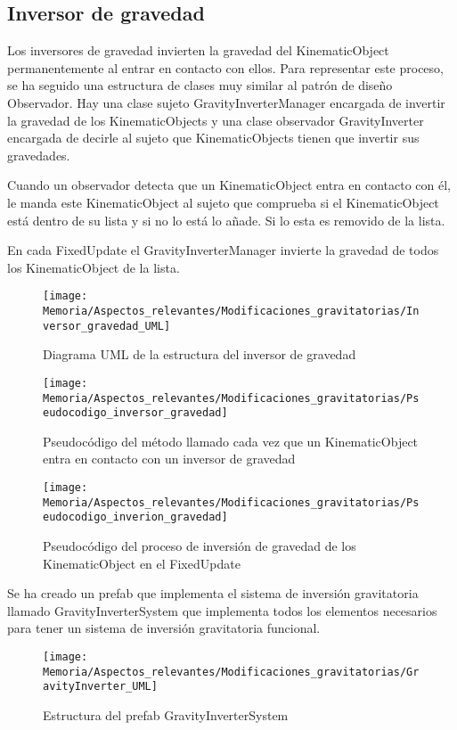 \subsection{Inversor de gravedad}
Los inversores de gravedad invierten la gravedad del KinematicObject permanentemente al entrar en contacto con ellos. Para representar este proceso, se ha seguido una estructura de clases muy similar al patrón de diseño Observador. Hay una clase sujeto GravityInverterManager encargada de invertir la gravedad de los KinematicObjects y una clase observador GravityInverter encargada de decirle al sujeto que KinematicObjects tienen que invertir sus gravedades.

Cuando un observador detecta que un KinematicObject entra en contacto con él, le manda este KinematicObject al sujeto que comprueba si el KinematicObject está dentro de su lista y si no lo está lo añade. Si lo esta es removido de la lista.

En cada FixedUpdate el GravityInverterManager invierte la gravedad de todos los KinematicObject de la lista.

\begin{figure}[h]
\centering
\texttt{[image: Memoria/Aspectos\_relevantes/Modificaciones\_gravitatorias/Inversor\_gravedad\_UML]}
\caption{Diagrama UML de la estructura del inversor de gravedad}
\end{figure}

\begin{figure}[h]
\centering
\texttt{[image: Memoria/Aspectos\_relevantes/Modificaciones\_gravitatorias/Pseudocodigo\_inversor\_gravedad]}
\caption{Pseudocódigo del método llamado cada vez que un KinematicObject entra en contacto con un inversor de gravedad}
\end{figure}

\begin{figure}[h]
\centering
\texttt{[image: Memoria/Aspectos\_relevantes/Modificaciones\_gravitatorias/Pseudocodigo\_inverion\_gravedad]}
\caption{Pseudocódigo del proceso de inversión de gravedad de los KinematicObject en el FixedUpdate}
\end{figure}

Se ha creado un prefab que implementa el sistema de inversión gravitatoria llamado GravityInverterSystem que implementa todos los elementos necesarios para tener un sistema de inversión gravitatoria funcional.

\begin{figure}[h]
\centering
\texttt{[image: Memoria/Aspectos\_relevantes/Modificaciones\_gravitatorias/GravityInverter\_UML]}
\caption{Estructura del prefab GravityInverterSystem}
\end{figure}

